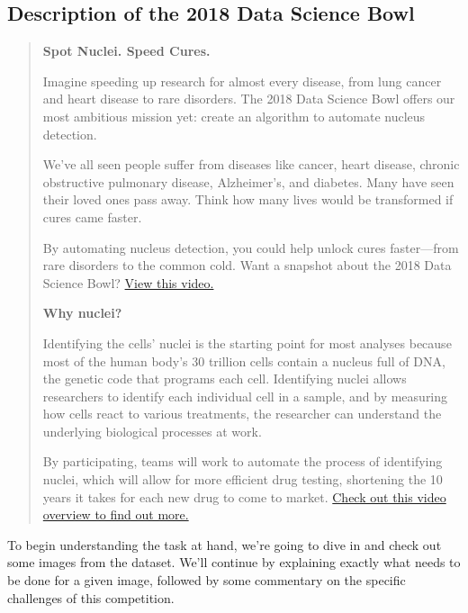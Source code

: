 \documentclass[paper=letter, fontsize=12pt]{article}
\numberwithin{equation}{section} %
\numberwithin{figure}{section} %
\numberwithin{table}{section} %
\begin{document}
\begin{appendixatend}
    \subsection{Description of the 2018 Data Science
    Bowl}\label{app:competition-description}
    \begin{quote}
        \textbf{\large Spot Nuclei. Speed Cures.}

        Imagine speeding up research for almost every disease, from lung
        cancer and heart disease to rare disorders. The 2018 Data Science
        Bowl offers our most ambitious mission yet: create an algorithm to
        automate nucleus detection.

        We've all seen people suffer from diseases like cancer, heart
        disease, chronic obstructive pulmonary disease, Alzheimer's, and
        diabetes. Many have seen their loved ones pass away. Think how many
        lives would be transformed if cures came faster.

        By automating nucleus detection, you could help unlock cures
        faster—from rare disorders to the common cold. Want a snapshot
        about the 2018 Data Science Bowl?
        \href{https://www.youtube.com/watch?v=eHwkfhmJexs}{View this
        video.}

        \textbf{\large Why nuclei?}

        Identifying the cells' nuclei is the starting point for most
        analyses because most of the human body's 30 trillion cells contain
        a nucleus full of DNA, the genetic code that programs each cell.
        Identifying nuclei allows researchers to identify each individual
        cell in a sample, and by measuring how cells react to various
        treatments, the researcher can understand the underlying biological
        processes at work.

        By participating, teams will work to automate the process of
        identifying nuclei, which will allow for more efficient drug
        testing, shortening the 10 years it takes for each new drug to come
        to market.
        \href{https://datasciencebowl.com/2018dsbtutorial/}{Check out this
        video overview to find out more.}
    \end{quote}
\end{appendixatend}

To begin understanding the task at hand, we're going to dive in and check out
some images from the dataset.  We'll continue by explaining exactly what needs
to be done for a given image, followed by some commentary on the specific
challenges of this competition.
\end{document}
